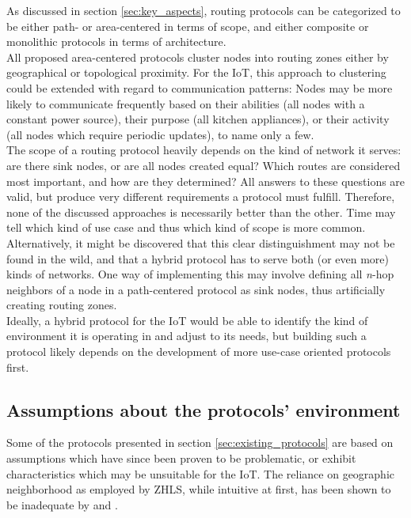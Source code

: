\documentclass[a4paper,10pt]{scrartcl}
\begin{document}
As discussed in section \ref{sec:key_aspects}, routing protocols can be categorized to be either path- or area-centered in terms of scope, and either composite or monolithic protocols in terms of architecture.\\ %
All proposed area-centered protocols cluster nodes into routing zones either by geographical or topological proximity. For the IoT, this approach to clustering could be extended with regard to communication patterns: Nodes may be more likely to communicate frequently based on their abilities (all nodes with a constant power source), their purpose (all kitchen appliances), or their activity (all nodes which require periodic updates), to name only a few.\\
The scope of a routing protocol heavily depends on the kind of network it serves: are there sink nodes, or are all nodes created equal? Which routes are considered most important, and how are they determined? All answers to these questions are valid, but produce very different requirements a protocol must fulfill.
Therefore, none of the discussed approaches is necessarily better than the other. Time may tell which kind of use case and thus which kind of scope is more common. Alternatively, it might be discovered that this clear distinguishment may not be found in the wild, and that a hybrid protocol has to serve both (or even more) kinds of networks. One way of implementing this may involve defining all \emph{n}-hop neighbors of a node in a path-centered protocol as sink nodes, thus artificially creating routing zones.\\
Ideally, a hybrid protocol for the IoT would be able to identify the kind of environment it is operating in and adjust to its needs, but building such a protocol likely depends on the development of more use-case oriented protocols first.\\

\subsection{Assumptions about the protocols' environment}
\label{subsec:assumptions}
Some of the protocols presented in section \ref{sec:existing_protocols} are based on assumptions which have since been proven to be problematic, or exhibit characteristics which may be unsuitable for the IoT. The reliance on geographic neighborhood as employed by ZHLS, while intuitive at first, has been shown to be inadequate by \cite{mistaken-axioms} and \cite{lim_link_stability}.\\
\end{document}
